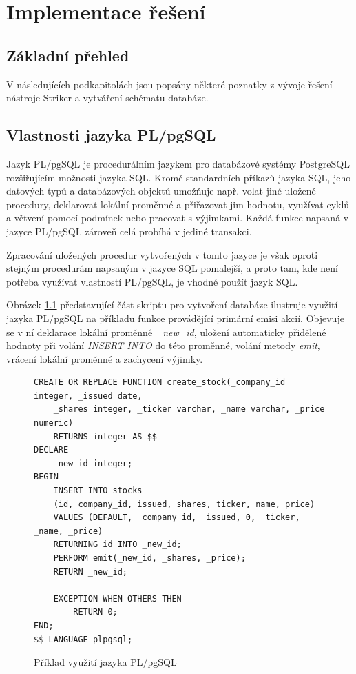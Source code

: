\documentclass[thesis=M,czech]{FITthesis}[2012/06/26]
\begin{document}
\chapter{Implementace řešení}

\section{Základní přehled}

V následujících podkapitolách jsou popsány některé poznatky z vývoje řešení nástroje Striker a vytváření schématu databáze.
 

\section{Vlastnosti jazyka PL/pgSQL}

Jazyk PL/pgSQL \cite{pgplpgsql} je procedurálním jazykem pro databázové systémy PostgreSQL rozšiřujícím možnosti jazyka SQL. 
Kromě standardních příkazů jazyka SQL, jeho datových typů a databázových objektů umožňuje např. volat jiné uložené procedury, 
deklarovat lokální proměnné a přiřazovat jim hodnotu, využívat cyklů a větvení pomocí podmínek nebo pracovat s výjimkami. 
Každá funkce napsaná v jazyce PL/pgSQL zároveň celá probíhá v jediné transakci. 

Zpracování uložených procedur vytvořených 
v tomto jazyce je však oproti stejným procedurám napsaným v jazyce SQL pomalejší, a proto tam, kde není potřeba využívat vlastností
PL/pgSQL, je vhodné použít jazyk SQL.

Obrázek \ref{fig:impl-plpgsql} představující část skriptu pro vytvoření databáze ilustruje využití jazyka PL/pgSQL na příkladu funkce provádějící 
primární emisi akcií. Objevuje se v ní deklarace lokální proměnné \textit{\_new\_id}, uložení automaticky přidělené hodnoty při 
volání \textit{INSERT INTO} do této proměnné, volání metody \textit{emit}, vrácení lokální proměnné a zachycení výjimky.

\begin{figure}\centering
	\begin{lstlisting}[basicstyle={\scriptsize\ttfamily}, frame=single] 
CREATE OR REPLACE FUNCTION create_stock(_company_id integer, _issued date, 
	_shares integer, _ticker varchar, _name varchar, _price numeric) 
	RETURNS integer AS $$
DECLARE 
    _new_id integer;
BEGIN
    INSERT INTO stocks 
	(id, company_id, issued, shares, ticker, name, price) 
	VALUES (DEFAULT, _company_id, _issued, 0, _ticker, _name, _price)
	RETURNING id INTO _new_id;
    PERFORM emit(_new_id, _shares, _price);
    RETURN _new_id;                        

    EXCEPTION WHEN OTHERS THEN
        RETURN 0;
END;
$$ LANGUAGE plpgsql;
	\end{lstlisting}
	\caption[Příklad využití jazyka PL/pgSQL]{Příklad využití jazyka PL/pgSQL}\label{fig:impl-plpgsql}
\end{figure}
\end{document}
